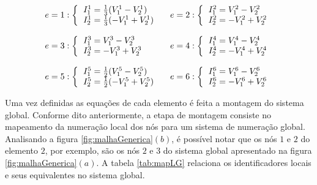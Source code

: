 \documentclass[
    12pt,               %
    openright,          %
    oneside,
    a4paper,            %
    english,            %
    french,             %
    spanish,            %
    brazil              %
    ]{abntex2}
\begin{document}
 \begin{equation}
    \label{eq:ohmMalha}
    \begin{tabular}{l l}
	$
	e = 1:
	\left \{
     \begin{tabular}{l}
         $I_1^1 = \frac{1}{3} (V_1^1 - V_2^1)$ \\
         $I_2^1 = \frac{1}{3} (-V_1^1 + V_2^1)$
     \end{tabular}       
     \right .       
     $
	&
	$
	e = 2:
	\left \{
     \begin{tabular}{l}
         $I_1^2 = V_1^2 - V_2^2$ \\
         $I_2^2 = -V_1^2 + V_2^2$
     \end{tabular}       
     \right .       
     $
	\\ \\
	$
	e = 3:
	\left \{
     \begin{tabular}{l}
         $I_1^3 = V_1^3 - V_2^3$ \\
         $I_2^3 = -V_1^3 + V_2^3$
     \end{tabular}       
     \right .       
     $
	&
	$
	e = 4:
	\left \{
     \begin{tabular}{l}
         $I_1^4 = V_1^4 - V_2^4$ \\
         $I_2^4 = -V_1^4 + V_2^4$
     \end{tabular}       
     \right .       
     $
	\\ \\
	$
	e = 5:
	\left \{
     \begin{tabular}{l}
         $I_1^5 = \frac{1}{2} (V_1^5 - V_2^5)$ \\
         $I_2^5 = \frac{1}{2} (-V_1^5 + V_2^5)$
     \end{tabular}       
     \right .       
     $
	&
	$
	e = 6:
	\left \{
     \begin{tabular}{l}
         $I_1^6 = V_1^6 - V_2^6$ \\
         $I_2^6 = -V_1^6 + V_2^6$
     \end{tabular}       
     \right .       
     $                    
     \end{tabular}               
 \end{equation}

Uma vez definidas as equações de cada elemento é feita a montagem do sistema global. Conforme dito anteriormente, a etapa de montagem consiste no mapeamento da numeração local dos nós para um sistema de numeração global. Analisando a figura \ref{fig:malhaGenerica}$(b)$, é possível notar que os nós $1$ e $2$ do elemento $2$, por exemplo, são os nós $2$ e $3$ do sistema global apresentado na figura \ref{fig:malhaGenerica}$(a)$. A tabela \ref{tab:mapLG} relaciona os identificadores locais e seus equivalentes no sistema global.
\end{document}
